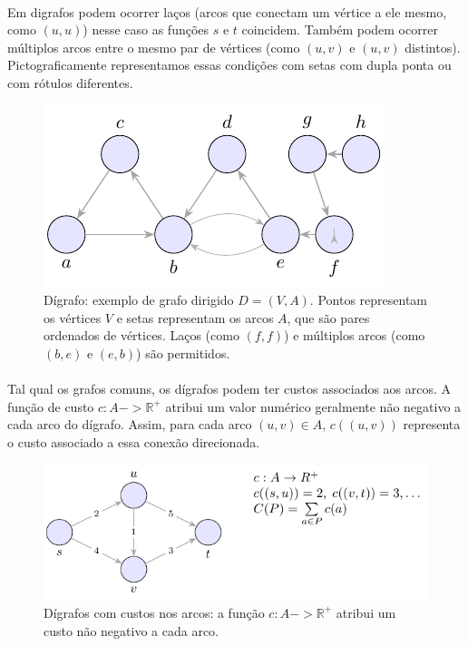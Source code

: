 \documentclass[12pt,a4paper]{article}
\def\to{->}%
\begin{document}
\paragraph{}
Em digrafos podem ocorrer laços (arcos que conectam um vértice a ele mesmo, como \((u, u)\)) nesse caso as funções \(s\) e \(t\) coincidem. Também podem ocorrer múltiplos arcos entre o mesmo par de vértices (como \((u, v)\) e \((u, v)\) distintos). Pictograficamente representamos essas condições com setas com dupla ponta ou com rótulos diferentes.


\begin{figure}[H]
    \centering
    \includegraphics[width=0.9\linewidth]{figures/fig_def_digrafo_simples.pdf}

    \caption{Dígrafo: exemplo de grafo dirigido \(D=(V,A)\). Pontos representam os vértices \(V\) e setas representam os arcos \(A\), que são pares ordenados de vértices. Laços (como \((f,f)\)) e múltiplos arcos (como \((b,e)\) e \((e,b)\)) são permitidos.}
    \label{fig:def-digrafo-simples}\end{figure}


\paragraph{}
Tal qual os grafos comuns, os dígrafos podem ter custos associados aos arcos. A função de custo \(c: A \to \mathbb{R}^+\) atribui um valor numérico geralmente não negativo a cada arco do dígrafo. Assim, para cada arco \((u, v) \in A\), \(c((u, v))\) representa o custo associado a essa conexão direcionada.


\begin{figure}[H]
    \centering
    \includegraphics[width=0.9\linewidth]{figures/fig_digrafo_custos.pdf}

    \caption{Dígrafos com custos nos arcos: a função $c:A\to\mathbb{R}^+$ atribui um custo não negativo a cada arco.}
    \label{fig:digrafo-custos}
\end{figure}
\end{document}
